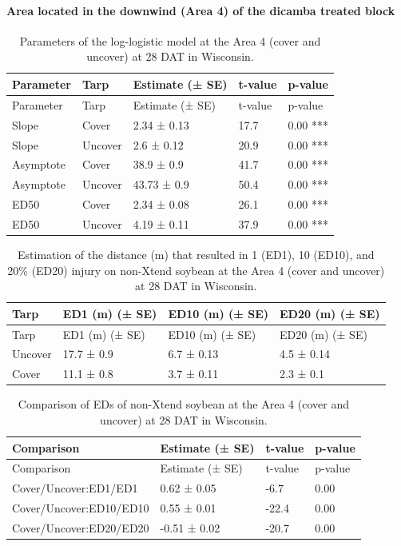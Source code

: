 \documentclass[]{article}
\let\oldparagraph\paragraph
\renewcommand{\paragraph}[1]{\oldparagraph{#1}\mbox{}}
\begin{document}
\pagebreak
\newpage

\paragraph{Area located in the downwind (Area 4) of the dicamba treated
block}\label{area-located-in-the-downwind-area-4-of-the-dicamba-treated-block}

\begin{longtable}[]{@{}lllll@{}}
\caption{Parameters of the log-logistic model at the Area 4 (cover and
uncover) at 28 DAT in Wisconsin.}\tabularnewline
\toprule
Parameter & Tarp & Estimate (± SE) & t-value & p-value\tabularnewline
\midrule
\endfirsthead
\toprule
Parameter & Tarp & Estimate (± SE) & t-value & p-value\tabularnewline
\midrule
\endhead
Slope & Cover & 2.34 ± 0.13 & 17.7 & 0.00 ***\tabularnewline
Slope & Uncover & 2.6 ± 0.12 & 20.9 & 0.00 ***\tabularnewline
Asymptote & Cover & 38.9 ± 0.9 & 41.7 & 0.00 ***\tabularnewline
Asymptote & Uncover & 43.73 ± 0.9 & 50.4 & 0.00 ***\tabularnewline
ED50 & Cover & 2.34 ± 0.08 & 26.1 & 0.00 ***\tabularnewline
ED50 & Uncover & 4.19 ± 0.11 & 37.9 & 0.00 ***\tabularnewline
\bottomrule
\end{longtable}

\begin{longtable}[]{@{}llll@{}}
\caption{Estimation of the distance (m) that resulted in 1 (ED1), 10
(ED10), and 20\% (ED20) injury on non-Xtend soybean at the Area 4 (cover
and uncover) at 28 DAT in Wisconsin.}\tabularnewline
\toprule
Tarp & ED1 (m) (± SE) & ED10 (m) (± SE) & ED20 (m) (± SE)\tabularnewline
\midrule
\endfirsthead
\toprule
Tarp & ED1 (m) (± SE) & ED10 (m) (± SE) & ED20 (m) (± SE)\tabularnewline
\midrule
\endhead
Uncover & 17.7 ± 0.9 & 6.7 ± 0.13 & 4.5 ± 0.14\tabularnewline
Cover & 11.1 ± 0.8 & 3.7 ± 0.11 & 2.3 ± 0.1\tabularnewline
\bottomrule
\end{longtable}

\begin{longtable}[]{@{}llll@{}}
\caption{Comparison of EDs of non-Xtend soybean at the Area 4 (cover and
uncover) at 28 DAT in Wisconsin.}\tabularnewline
\toprule
Comparison & Estimate (± SE) & t-value & p-value\tabularnewline
\midrule
\endfirsthead
\toprule
Comparison & Estimate (± SE) & t-value & p-value\tabularnewline
\midrule
\endhead
Cover/Uncover:ED1/ED1 & 0.62 ± 0.05 & -6.7 & 0.00\tabularnewline
Cover/Uncover:ED10/ED10 & 0.55 ± 0.01 & -22.4 & 0.00\tabularnewline
Cover/Uncover:ED20/ED20 & -0.51 ± 0.02 & -20.7 & 0.00\tabularnewline
\bottomrule
\end{longtable}
\end{document}
